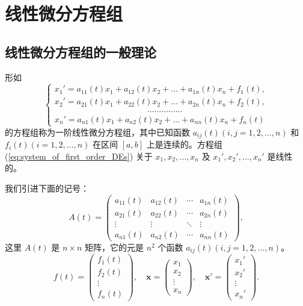 \chapter{线性微分方程组}\label{chap:线性微分方程组}
\section{线性微分方程组的一般理论}\label{sec:线性微分方程组的一般理论}
\begin{definition}[一阶线性微分方程组]\label{def:一阶线性微分方程组}
    形如
\begin{equation}
\begin{cases}
x_1' = a_{11}(t)x_1+a_{12}(t)x_2+\dots+a_{1n}(t)x_n+f_1(t), \\
x_2' = a_{21}(t)x_1+a_{22}(t)x_2+\dots+a_{2n}(t)x_n+f_2(t), \\
\quad \quad \quad \quad \quad \quad \quad \quad \quad \quad \quad \dots \dots \dots \dots \dots \\
x_n' = a_{n1}(t)x_1+a_{n2}(t)x_2+\dots+a_{nn}(t)x_n+f_n(t)
\end{cases} \label{eq:system_of_first_order_DEs}
\end{equation}
的方程组称为一阶线性微分方程组，其中已知函数 $a_{ij}(t) (i,j=1,2,\dots,n)$ 和 $f_i(t) (i=1,2,\dots,n)$
在区间 $[a,b]$ 上是连续的。方程组 (\ref{eq:system_of_first_order_DEs}) 关于 $x_1,x_2,\dots,x_n$ 及 $x_1',x_2',\dots,x_n'$ 是线性的。
\end{definition}
我们引进下面的记号：
\begin{equation}
A(t) = \begin{pmatrix}
a_{11}(t) & a_{12}(t) & \cdots & a_{1n}(t) \\
a_{21}(t) & a_{22}(t) & \cdots & a_{2n}(t) \\
\vdots & \vdots & \ddots & \vdots \\
a_{n1}(t) & a_{n2}(t) & \cdots & a_{nn}(t)
\end{pmatrix}, \label{eq:matrix_A_t}
\end{equation}
这里 $A(t)$ 是 $n \times n$ 矩阵，它的元是 $n^2$ 个函数 $a_{ij}(t) (i,j=1,2,\dots,n)$。
\begin{equation}
f(t) = \begin{pmatrix} f_1(t) \\ f_2(t) \\ \vdots \\ f_n(t) \end{pmatrix}, \quad \mathbf{x} = \begin{pmatrix} x_1 \\ x_2 \\ \vdots \\ x_n \end{pmatrix}, \quad \mathbf{x}' = \begin{pmatrix} x_1' \\ x_2' \\ \vdots \\ x_n' \end{pmatrix}. \label{eq:vector_notation}
\end{equation}
